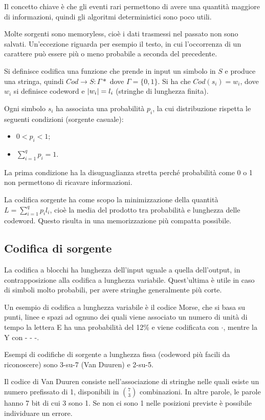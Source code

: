 Il concetto chiave è che gli eventi rari permettono di avere una quantità maggiore di informazioni, quindi gli algoritmi deterministici sono poco utili.

Molte sorgenti sono memoryless, cioè i dati trasmessi nel passato non sono salvati. Un'eccezione riguarda per esempio il testo, in cui l'occorrenza di un carattere può essere più o meno probabile a seconda del precedente.

Si definisce codifica una funzione che prende in input un simbolo in $S$ e produce una stringa, quindi $Cod \rightarrow S : \Gamma*$ dove $\Gamma = \{0, 1\}$. Si ha che $Cod(s_i) = w_i$, dove $w_i$ si definisce codeword e $\left|w_i\right| = l_i$ (stringhe di lunghezza finita).

Ogni simbolo $s_i$ ha associata una probabilità $p_i$, la cui distribuzione rispetta le seguenti condizioni (sorgente casuale):
\begin{itemize}
	\item $0 < p_i < 1$;
	\item $\sum_{i=1}^{q} p_i = 1$.
\end{itemize}

La prima condizione ha la disuguaglianza stretta perché probabilità come 0 o 1 non permettono di ricavare informazioni.

La codifica sorgente ha come scopo la minimizzazione della quantità $L = \sum_{i=1}^{q} p_il_i$, cioè la media del prodotto tra probabilità e lunghezza delle codeword. Questo risulta in una memorizzazione più compatta possibile.

\subsection{Codifica di sorgente}
La codifica a blocchi ha lunghezza dell'input uguale a quella dell'output, in contrapposizione alla codifica a lunghezza variabile. Quest'ultima è utile in caso di simboli molto probabili, per avere stringhe generalmente più corte. 

Un esempio di codifica a lunghezza variabile è il codice Morse, che si basa su punti, linee e spazi ad ognuno dei quali viene associato un numero di unità di tempo la lettera E ha una probabilità del 12\% e viene codificata con $\cdot$, mentre la Y con - - -.

Esempi di codifiche di sorgente a lunghezza fissa (codeword più facili da riconoscere) sono 3-su-7 (Van Duuren) e 2-su-5. 

Il codice di Van Duuren consiste nell'associazione di stringhe nelle quali esiste un numero prefissato di 1, disponibili in $\binom{7}{3}$ combinazioni. In altre parole, le parole hanno 7 bit di cui 3 sono 1. Se non ci sono 1 nelle posizioni previste è possibile individuare un errore.

